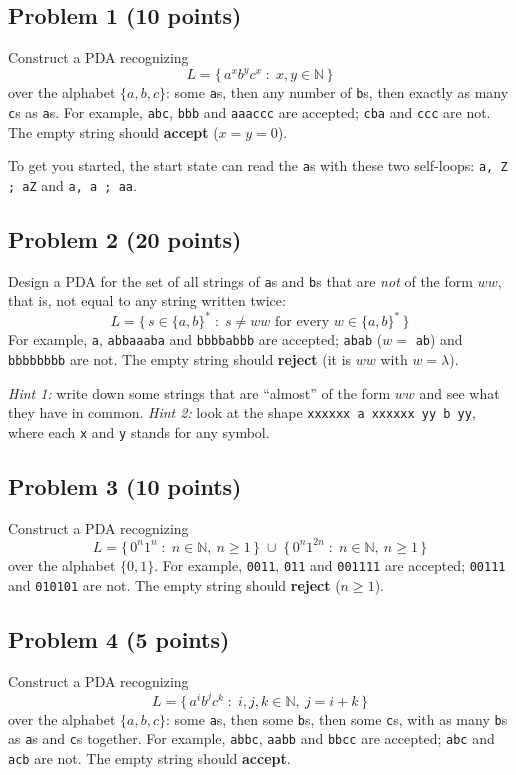 \documentclass[11pt]{article}
\newcommand{\tr}[3]{\texttt{#1, #2 ; #3}}
\begin{document}
\subsection*{Problem 1 (10 points)}
Construct a PDA recognizing
\[
  L = \{\, a^x b^y c^x \;:\; x, y \in \mathbb{N} \,\}
\]
over the alphabet $\{a, b, c\}$: some \texttt{a}s, then any number of \texttt{b}s, then exactly
as many \texttt{c}s as \texttt{a}s. For example, \texttt{abc}, \texttt{bbb} and
\texttt{aaacc\-c} are accepted; \texttt{cba} and \texttt{ccc} are not. The empty string should
\textbf{accept} ($x = y = 0$).

To get you started, the start state can read the \texttt{a}s with these two self-loops:
\tr{a}{Z}{aZ} and \tr{a}{a}{aa}.

\subsection*{Problem 2 (20 points)}
Design a PDA for the set of all strings of \texttt{a}s and \texttt{b}s that are \emph{not} of the
form $ww$, that is, not equal to any string written twice:
\[
  L = \{\, s \in \{a,b\}^* \;:\; s \ne ww \text{ for every } w \in \{a,b\}^* \,\}
\]
For example, \texttt{a}, \texttt{abbaaaba} and \texttt{bbbbabbb} are accepted; \texttt{abab}
($w = $ \texttt{ab}) and \texttt{bbbbbbbb} are not. The empty string should \textbf{reject}
(it is $ww$ with $w = \lambda$).

\emph{Hint 1:} write down some strings that are ``almost'' of the form $ww$ and see what they
have in common. \emph{Hint 2:} look at the shape
\texttt{xxxxxx\,a\,xxxxxx\,yy\,b\,yy}, where each \texttt{x} and \texttt{y} stands for any
symbol.

\subsection*{Problem 3 (10 points)}
Construct a PDA recognizing
\[
  L = \{\, 0^n 1^n \;:\; n \in \mathbb{N},\ n \ge 1 \,\} \;\cup\; \{\, 0^n 1^{2n} \;:\; n \in
  \mathbb{N},\ n \ge 1 \,\}
\]
over the alphabet $\{0, 1\}$. For example, \texttt{0011}, \texttt{011} and \texttt{001111} are
accepted; \texttt{00111} and \texttt{010101} are not. The empty string should \textbf{reject}
($n \ge 1$).

\subsection*{Problem 4 (5 points)}
Construct a PDA recognizing
\[
  L = \{\, a^i b^j c^k \;:\; i, j, k \in \mathbb{N},\ j = i + k \,\}
\]
over the alphabet $\{a, b, c\}$: some \texttt{a}s, then some \texttt{b}s, then some
\texttt{c}s, with as many \texttt{b}s as \texttt{a}s and \texttt{c}s together. For example,
\texttt{abbc}, \texttt{aabb} and \texttt{bbcc} are accepted; \texttt{abc} and \texttt{acb} are
not. The empty string should \textbf{accept}.
\end{document}
